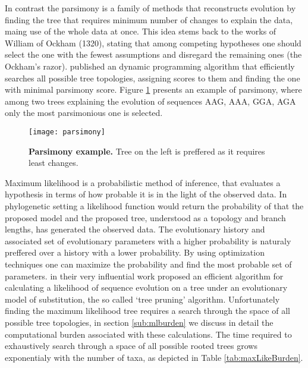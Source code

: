In contrast the parsimony is a family of methods that reconstructs evolution by finding the tree that requires minimum number of changes to explain the data, maing use of the whole data at once.
This idea stems back to the works of William of Ockham (1320), stating that among competing hypotheses one should select the one with the fewest assumptions and disregard the remaining ones (the Ockham's razor).
\cite{Fitch1971} published an dynamic programming algorithm that efficiently searches all possible tree topologies, assigning scores to them and finding the one with minimal parsimony score.
Figure \ref{fig:parsimony} presents an example of parsimony, where among two trees explaining the evolution of sequences {\color{green}AAG}, {\color{green}AAA}, {\color{green}GGA}, {\color{green}AGA} only the most parsimonious one is selected.

\begin{figure}[H]
\centering
\texttt{[image: parsimony]} 
\caption{
{ \footnotesize 
{\bf Parsimony example.} Tree on the left is preffered as it requires least changes.
}%
}
\label{fig:parsimony}
\end{figure}

Maximum likelihood is a probabilistic method of inference, that evaluates a hypothesis in terms of how probable it is in the light of the observed data.
In phylogenetic setting a likelihood function would return the probability of that the proposed model and the proposed tree, understood as a topology and branch lengths, has generated the observed data.
The evolutionary history and associated set of evolutionary parameters with a higher probability is naturaly preffered over a history with a lower probability.
By using optimization techniques one can maximize the probability and find the most probable set of parameters.
\cite{Felsenstein1981} in their very influential work proposed an efficient algorithm for calculating a likelihood of sequence evolution on a tree under an evolutionary model of substitution, the so called `tree pruning' algorithm.
Unfortunately finding the maximum likelihood tree requires a search through the space of all possible tree topologies, in section \ref{sub:mlburden} we discuss in detail the computational burden associated with these calculations.
The time required to exhaustively search through a space of all possible rooted trees grows exponentialy with the number of taxa, as depicted in Table \ref{tab:maxLikeBurden}.

